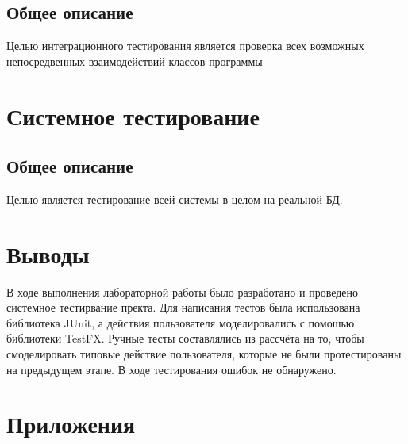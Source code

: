 \documentclass[a4paper,12pt]{article}
\begin{document}
\subsection{Общее описание}
Целью интеграционного тестирования является проверка всех возможных непосредвенных взаимодействий классов программы

\newpage \section{Системное тестирование}
\subsection{Общее описание}
Целью является тестирование всей системы в целом на реальной БД.

\newpage\section*{Выводы}
В ходе выполнения лабораторной работы было разработано и проведено системное тестирвание пректа. Для написания тестов была использована библиотека JUnit, а действия пользователя моделировались с помошью библиотеки TestFX. Ручные тесты составлялись из рассчёта на то, чтобы смоделировать типовые действие пользователя, которые не были протестированы на предыдущем этапе. В ходе тестирования ошибок не обнаружено.

\newpage\section*{Приложения}
\end{document}
